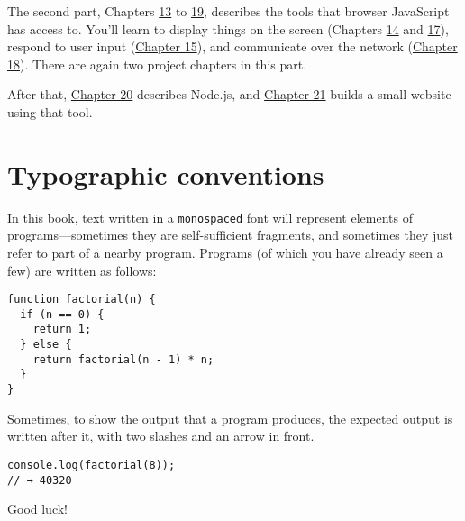 The second part, Chapters \hyperref[browser]{13} to \hyperref[paint]{19}, describes the tools that browser JavaScript has access to. You'll learn to display things on the screen (Chapters \hyperref[dom]{14} and \hyperref[canvas]{17}), respond to user input (\hyperref[event]{Chapter 15}), and communicate over the network (\hyperref[http]{Chapter 18}). There are again two project chapters in this part.

After that, \hyperref[node]{Chapter 20} describes Node.js, and \hyperref[skillsharing]{Chapter 21} builds a small website using that tool.

\section{Typographic conventions}

In this book, text written in a \lstinline`monospaced` font will represent elements of programs—sometimes they are self-sufficient fragments, and sometimes they just refer to part of a nearby program. Programs (of which you have already seen a few) are written as follows:

\begin{lstlisting}
function factorial(n) {
  if (n == 0) {
    return 1;
  } else {
    return factorial(n - 1) * n;
  }
}
\end{lstlisting}
\noindent{}

Sometimes, to show the output that a program produces, the expected output is written after it, with two slashes and an arrow in front.

\begin{lstlisting}
console.log(factorial(8));
// → 40320
\end{lstlisting}
\noindent

Good luck!
